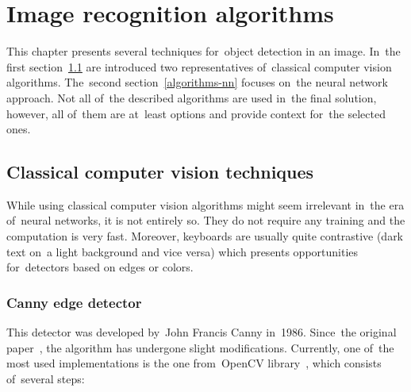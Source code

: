 \chapter{Image recognition algorithms}
\label{algorithms}
This chapter presents several techniques for~object detection in an image. In~the first \mbox{section}~\ref{algorithms-classical} are introduced two representatives of~classical computer vision algorithms. The~second section~\ref{algorithms-nn} focuses on~the neural network approach. Not all of~the described algorithms are used in~the final solution, however, all of~them are at~least options and provide context for~the selected ones.

\section{Classical computer vision techniques}
\label{algorithms-classical}
While using classical computer vision algorithms might seem irrelevant in~the era of~neural networks, it is not entirely so. They do not require any training and the computation is very fast. Moreover, keyboards are usually quite contrastive (dark text on~a light background and vice versa) which presents opportunities for~detectors based on edges or colors.

\subsection{Canny edge detector}
\label{algorithms-classical-canny}
This detector was developed by~John Francis Canny in~1986. Since~the original paper~\cite{canny-paper}, the algorithm has undergone slight modifications. Currently, one of~the most used implementations is the one from~OpenCV library~\cite{opencv-library}, which consists of~several steps:

